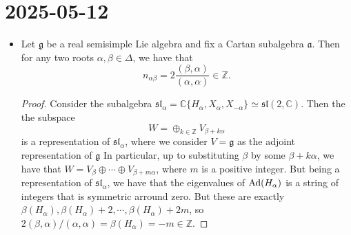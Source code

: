 \documentclass{report}
\begin{document}
\section{2025-05-12}
\begin{itemize}
    \item Let $\mathfrak g$ be a real semisimple Lie algebra and fix a Cartan subalgebra $\mathfrak a$.
    Then for any two roots $\alpha, \beta \in \Delta$, we have that
    \[
    n_{\alpha \beta} = 2\frac{(\beta, \alpha)}{(\alpha, \alpha)} \in \mathbb Z.
    \]
    \begin{proof}
        Consider the subalgebra $\mathfrak{sl}_\alpha = \mathbb C{\{H_\alpha, X_\alpha, X_{-\alpha}\}} \simeq \mathfrak{sl}(2, \mathbb C)$.
        Then the the subspace
        \[
        W = \oplus_{k \in \mathbb Z} V_{\beta + k \alpha}
        \]
        is a representation of $\mathfrak{sl}_\alpha$, where we consider $V = \mathfrak g$ as the adjoint representation of $\mathfrak g$
        In particular, up to substituting $\beta$ by some $\beta + k \alpha$, we have that $W = V_\beta \oplus \cdots \oplus V_{\beta + m\alpha}$, where $m$ is a positive integer.
        But being a representation of $\mathfrak{sl}_\alpha$, we have that the eigenvalues of $\operatorname{Ad}(H_\alpha)$ is a string of integers that is symmetric arround zero.
        But these are exactly $\beta(H_\alpha), \beta(H_\alpha) + 2, \cdots, \beta(H_\alpha) + 2m$, so $2(\beta, \alpha)/ (\alpha, \alpha) = \beta(H_\alpha) = -m \in \mathbb Z$.
    \end{proof}
\end{itemize}
\end{document}
